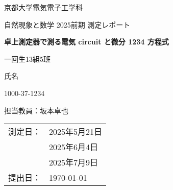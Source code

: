 \begin{titlepage}
	\centering
	\sffamily
	{\LARGE 京都大学電気電子工学科\par}
	\vspace{1cm}
	{\Large 自然現象と数学 2025前期 測定レポート\par}
	\vspace{1.5cm}
	{\huge\bfseries\myB 卓上測定器で測る電気 circuit と微分 1234 方程式\par}
	\vspace{2cm}
	{\Large 一回生13組5班\par}
	{\Large 氏名\par}
	{\Large 1000-37-1234\par}
	\vfill
	{\large 担当教員：坂本\quad 卓也}

	\vfill

	{
		\begin{table}[H]
			\centering
			\large
			\sffamily
			\begin{tabular}{ll}
				測定日： & 2025年5月21日 \\
				     & 2025年6月4日  \\
				     & 2025年7月9日  \\
				提出日： & \today
			\end{tabular}
		\end{table}
	}

\end{titlepage}
